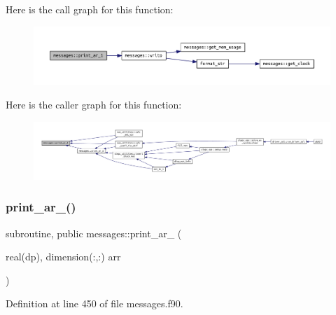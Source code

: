 Here is the call graph for this function\+:
\nopagebreak
\begin{figure}[H]
\begin{center}
\leavevmode
\includegraphics[width=350pt]{namespacemessages_a5686118397930f505259225f3688216b_cgraph}
\end{center}
\end{figure}
Here is the caller graph for this function\+:
\nopagebreak
\begin{figure}[H]
\begin{center}
\leavevmode
\includegraphics[width=350pt]{namespacemessages_a5686118397930f505259225f3688216b_icgraph}
\end{center}
\end{figure}
\mbox{\label{namespacemessages_a80797cedef6112b8dccaeda431f0c610}} 
\subsubsection{\texorpdfstring{print\+\_\+ar\+\_()}{print\_ar\_2()}}
{\footnotesize\ttfamily subroutine, public messages\+::print\+\_\+ar\+\_ (\begin{DoxyParamCaption}\item[{real(dp), dimension(\+:,\+:)}]{arr }\end{DoxyParamCaption})}



Definition at line 450 of file messages.\+f90.

